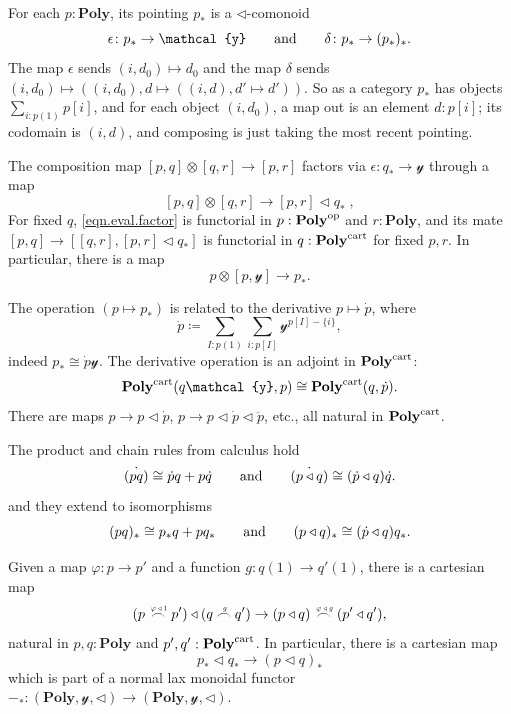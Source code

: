 \documentclass[11pt, one side, article]{memoir}
\theoremstyle{definition}
\theoremstyle{plain}
\newcommand{\Cat}[1]{\mathbf{#1}}%
\newcommand{\op}{^\tn{op}}
\newcommand{\tn}[1]{\textnormal{#1}}
\newcommand{\yon}{{\mathcal{y}}}
\newcommand{\poly}{\Cat{Poly}}
\newcommand{\cart}{\tn{cart}}
\newcommand{\polycart}{\poly^\cart}
\newcommand{\0}{\textsf{0}}
\newcommand{\1}{\tn{\textsf{1}}}
\newcommand{\tri}{\mathbin{\triangleleft}}
\newcommand{\indexcoclscale}[1]{\scalebox{.7}{#1}}
\newcommand{\cocl}[1]{
	\scriptsize\overset{\,\indexcoclscale{$#1$}}{\frown}\normalsize
}
\newcommand{\hh}[2][]{#1 \tn{#2} #1}
\newcommand{\qqand}{\hh[\qquad]{and}}
\begin{document}
For each $p:\poly$, its pointing $p_*$ is a $\tri$-comonoid
\begin{equation}\label{eqn.pointing_comonad}
	\epsilon\colon p_*\to\yon
	\qqand
	\delta\colon p_*\to (p_*)_*.
\end{equation}
The map $\epsilon$ sends $(i,d_0)\mapsto d_0$ and the map $\delta$ sends $(i,d_0)\mapsto((i,d_0), d\mapsto ((i,d), d'\mapsto d'))$. So as a category $p_*$ has objects $\sum_{i:p(1)}p[i]$, and for each object $(i,d_0)$, a map out is an element $d:p[i]$; its codomain is $(i,d)$, and composing is just taking the most recent pointing.

The composition map $[p,q]\otimes [q,r]\to [p,r]$ factors via $\epsilon\colon q_*\to \yon$ through a map
\begin{equation}\label{eqn.eval.factor}
	[p,q]\otimes [q,r]\to [p,r]\tri q_*\;,
\end{equation}
For fixed $q$, \cref{eqn.eval.factor} is functorial in $p:\poly\op$ and $r:\poly$, and its mate $[p,q]\to[[q,r],[p,r]\tri q_*]$ is functorial in $q:\polycart$ for fixed $p,r$. In particular, there is a map
\begin{equation}
p\otimes[p,\yon]\to p_*.
\end{equation}

The operation $(p\mapsto p_*)$ is related to the derivative $p\mapsto\dot{p}$, where
\begin{equation}
\dot{p}\coloneqq\sum_{I:p(1)}\sum_{i:p[I]}\yon^{p[I]-\{i\}},
\end{equation}
indeed $p_*\cong\dot{p}\yon$. The derivative operation is an adjoint in $\polycart$:
\begin{equation}
  \polycart(q\yon,p)\cong
  \polycart(q,\dot{p}).
\end{equation}
There are maps $p\to p\tri\dot{p}$, $p\to p\tri\dot{p}\tri\ddot{p}$, etc., all natural in $\polycart$. 

The product and chain rules from calculus hold
\begin{equation}\label{eqn.calculus}
	\dot{(pq)}\cong \dot{p}q+p\dot{q}
	\qqand
	\dot{(p\tri q)}\cong(\dot{p}\tri q)\dot{q}.
\end{equation}
and they extend to isomorphisms 
\begin{equation}\label{eqn.calculus}
	(pq)_*\cong p_*q+pq_*
	\qqand
	(p\tri q)_*\cong(\dot{p}\tri q)q_*.
\end{equation}

Given a map $\varphi\colon p\to p'$ and a function $g\colon q(1)\to q'(1)$, there is a cartesian map
\begin{equation}
	(p\cocl{\varphi\tri1}p')\tri(q\cocl{g}q')\to
	(p\tri q)\cocl{\varphi\tri g}(p'\tri q'),
\end{equation}
natural in $p,q:\poly$ and $p',q':\polycart$. In particular, there is a cartesian map
\begin{equation}
	p_*\tri q_*\to(p\tri q)_*
\end{equation}
which is part of a normal lax monoidal functor $-_*\colon(\poly,\yon,\tri)\to(\poly,\yon,\tri)$.
\end{document}

